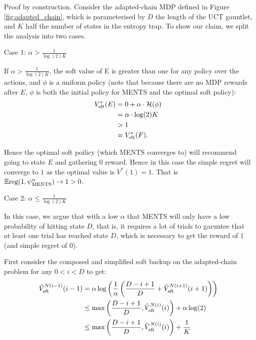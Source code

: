 \documentclass{article}
\newcommand{\Vst}[2]{\hat{V}^{#2}_{\textnormal{sft}}(#1)}
\newcommand{\Vss}[1]{V^*_{\textnormal{sft}}(#1)}
\newcommand{\reg}{\textnormal{reg}}
\theoremstyle{plain}
\newenvironment{proofoutline}{\proof[Proof outline]}{\endproof}
\begin{document}
\begin{appendices}
        \begin{proofoutline}
        		Proof by construction. Consider the adapted-chain MDP defined in Figure \ref{fig:adapted_chain}, which is parameterised by $D$ the length of the UCT gauntlet, and $K$ half the number of states in the entropy trap. To show our claim, we split the analysis into two cases.
        		
        		Case 1: $\alpha>\frac{1}{\log(2)K}$
        		
        		If $\alpha>\frac{1}{\log(2)K}$, the soft value of E is greater than one for any policy over the actions, and $\phi$ is a uniform policy (note that because there are no MDP rewards after $E$, $\phi$ is both the initial policy for MENTS and the optimal soft policy): 
	        \begin{align}
	        		\Vss{E} & = 0 + \alpha \cdot \mathcal{H}(\phi) \\
	        			& = \alpha \cdot \log(2)  K \\
	        			& > 1 \\
	        			& = \Vss{F}.
	        \end{align}
	        
	        Hence the optimal soft poilicy (which MENTS converges to) will recommend going to state $E$ and gathering $0$ reward. Hence in this case the simple regret will converge to $1$ as the optimal value is $V^*(1)=1$. That is $\mathbb{E}\reg(1,\psi^n_{\text{MENTS}}) \rightarrow 1 > 0$.
	        
	        Case 2: $\alpha\leq\frac{1}{\log(2)K}$
	        
	        In this case, we argue that with a low $\alpha$ that MENTS will only have a low probability of hitting state $D$, that is, it requires a lot of trials to garuntee that at least one trial has reached state $D$, which is necessary to get the reward of $1$ (and simple regret of $0$).
	        
	        First consider the composed and simplified soft backup on the adapted-chain problem for any $0<i<D$ to get:
	        \begin{align}
	        		\Vst{i-1}{N(i-1)} & = \alpha \log\left( \frac{1}{\alpha} \left( \frac{D-i+1}{D} + \Vst{i+1}{N(i+1)} \right)\right) \\
	        			& \leq \max\left(\frac{D-i+1}{D},\Vst{i}{N(i)}\right) + \alpha\log(2) \\
	        			& \leq \max\left(\frac{D-i+1}{D},\Vst{i}{N(i)}\right) + \frac{1}{K}
	        \end{align}
	        

\end{proofoutline}
\end{appendices}
\end{document}
